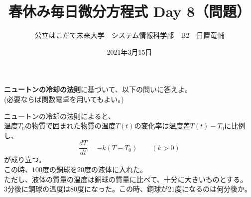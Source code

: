\documentclass[dvipdfmx,uplatex]{jsarticle}
\title{春休み毎日微分方程式 Day 8（問題）}
\author{公立はこだて未来大学　システム情報科学部　B2　日置竜輔}
\date{2021年3月15日}
\begin{document}
\begin{spacing}{1.6}
\maketitle

{\bf ニュートンの冷却の法則}に基づいて、以下の問いに答えよ。\\
(必要ならば関数電卓を用いてもよい。)
\begin{qparts}
  \qpart
  ニュートンの冷却の法則によると、\\
  温度$T_0$の物質で囲まれた物質の温度$T(t)$の変化率は温度差$T(t) - T_0$に比例し、
  \begin{equation}
    \frac{dT}{dt} = -k(T - T_0) \qquad (k > 0)\nonumber
  \end{equation}
  が成り立つ。\\
  この時、$100$度の銅球を$20$度の液体に入れた。\\
  ただし、液体の質量の温度は銅球の質量に比べて、十分に大きいものとする。\\
  $3$分後に銅球の温度は$80$度になった。この時、銅球が$21$度になるのは何分後か。\\

  \end{qparts}
\end{spacing}
\end{document}

